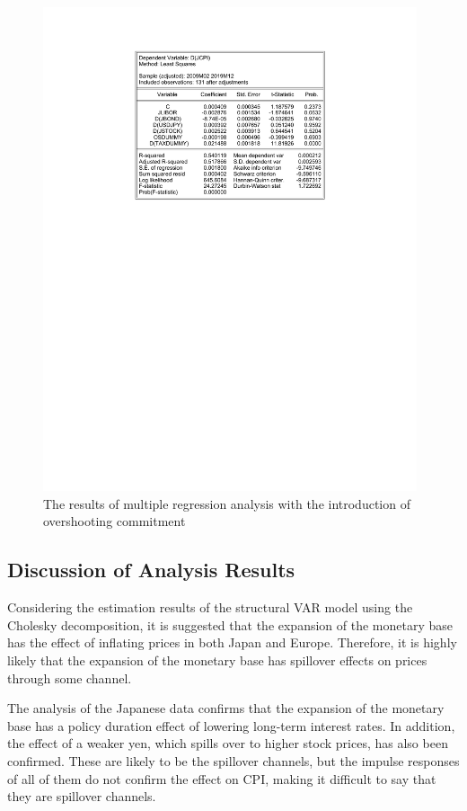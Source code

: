 \documentclass[12pt]{article}
\begin{document}
\begin{figure}[!htbp]
    \centering
    \caption{The results of multiple regression analysis with the introduction of overshooting commitment}
    \vspace{5pt}
    \includegraphics[width=11cm]{os.pdf}
\end{figure}

\newpage

\subsection{Discussion of Analysis Results}

Considering the estimation results of the structural VAR model using the Cholesky decomposition, it is suggested that the expansion of the monetary base has the effect of inflating prices in both Japan and Europe.
Therefore, it is highly likely that the expansion of the monetary base has spillover effects on prices through some channel.

The analysis of the Japanese data confirms that the expansion of the monetary base has a policy duration effect of lowering long-term interest rates.
In addition, the effect of a weaker yen, which spills over to higher stock prices, has also been confirmed.
These are likely to be the spillover channels, but the impulse responses of all of them do not confirm the effect on CPI, making it difficult to say that they are spillover channels.
\end{document}
